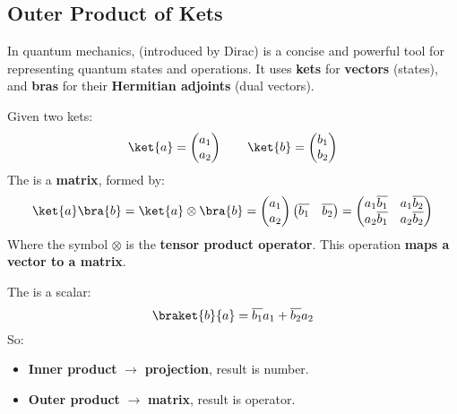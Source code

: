 \subsection{Outer Product of Kets}

In quantum mechanics,  (introduced by Dirac) is a concise and powerful tool for representing quantum states and operations. It uses \textbf{kets} \ket{\psi} for \textbf{vectors} (states), and \textbf{bras} \bra{\psi} for their \textbf{Hermitian adjoints} (dual vectors).

\highspace
Given two kets:
\begin{equation*}
    \ket{a} = \begin{pmatrix}
        a_{1} \\
        a_{2}
    \end{pmatrix}
    \hspace{2em}
    \ket{b} = \begin{pmatrix}
        b_{1} \\
        b_{2}
    \end{pmatrix}
\end{equation*}
The   is a \textbf{matrix}, formed by:
\begin{equation}
    \ket{a}\bra{b} = \ket{a} \otimes \bra{b} = \begin{pmatrix}
        a_{1} \\
        a_{2}
    \end{pmatrix}
    \begin{pmatrix}
        \overline{b_{1}} & \overline{b_{2}}
    \end{pmatrix}
    =
    \begin{pmatrix}
        a_{1}\overline{b_{1}} & a_{1}\overline{b_{2}} \\
        a_{2}\overline{b_{1}} & a_{2}\overline{b_{2}}
    \end{pmatrix}
\end{equation}
Where the symbol $\otimes$ is the \textbf{tensor product operator}. This operation \textbf{maps a vector to a matrix}.

\highspace
The   is a scalar:
\begin{equation}
    \braket{b}{a} = \overline{b_{1}} a_{1} + \overline{b_{2}} a_{2}
\end{equation}
So:
\begin{itemize}
    \item \textbf{Inner product} $\rightarrow$ \textbf{projection}, result is number.
    \item \textbf{Outer product} $\rightarrow$ \textbf{matrix}, result is operator.
\end{itemize}

